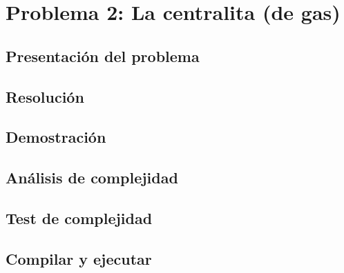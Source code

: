 \section{Problema 2: La centralita (de gas)}

\subsection{Presentaci\'on del problema}

\subsection{Resoluci\'on}

\subsection{Demostraci\'on}

\subsection{An\'alisis de complejidad}

\subsection{Test de complejidad}

\subsection{Compilar y ejecutar}
